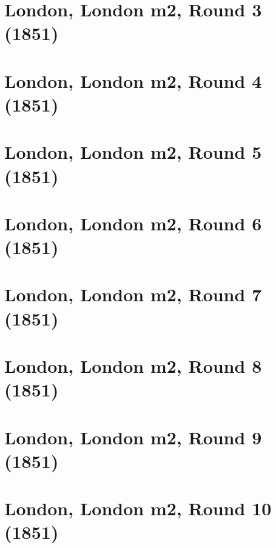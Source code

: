 \documentclass[11pt]{article}
\newcommand*\cleartoleftpage{%
   \clearpage
   \ifodd\value{page}\hbox{}\newpage\fi
}
\begin{document}
\cleartoleftpage

\section{London, London m2, Round 3 (1851)}


\cleartoleftpage

\section{London, London m2, Round 4 (1851)}


\cleartoleftpage

\section{London, London m2, Round 5 (1851)}


\cleartoleftpage

\section{London, London m2, Round 6 (1851)}


\cleartoleftpage

\section{London, London m2, Round 7 (1851)}


\cleartoleftpage

\section{London, London m2, Round 8 (1851)}


\cleartoleftpage

\section{London, London m2, Round 9 (1851)}


\cleartoleftpage

\section{London, London m2, Round 10 (1851)}

\end{document}
